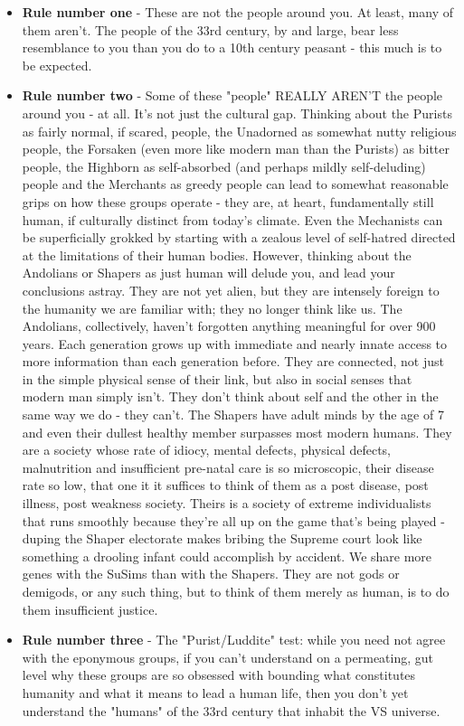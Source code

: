\begin{itemize}
\item {\bf Rule number one} - These are not the people around you. At least, many
of them aren't. The people of the 33rd century, by and large, bear
less resemblance to you than you do to a 10th century peasant - this
much is to be expected.

\item {\bf Rule number two} - Some of these "people" REALLY AREN'T the
people around you - at all. It's not just the cultural gap. Thinking
about the Purists as fairly normal, if scared, people, the Unadorned
as somewhat nutty religious people, the Forsaken (even more like
modern man than the Purists) as bitter people, the Highborn as
self-absorbed (and perhaps mildly self-deluding) people and the
Merchants as greedy people can lead to somewhat reasonable grips on
how these groups operate - they are, at heart, fundamentally still
human, if culturally distinct from today's climate. Even the
Mechanists can be superficially grokked by starting with a zealous
level of self-hatred directed at the limitations of their human
bodies. However, thinking about the Andolians or Shapers as just human
will delude you, and lead your conclusions astray. They are not yet
alien, but they are intensely foreign to the humanity we are familiar
with; they no longer think like us. The Andolians, collectively,
haven't forgotten anything meaningful for over 900 years. Each
generation grows up with immediate and nearly innate access to more
information than each generation before. They are connected, not just
in the simple physical sense of their link, but also in social senses
that modern man simply isn't. They don't think about self and the
other in the same way we do - they can't. The Shapers have adult minds
by the age of 7 and even their dullest healthy member surpasses most
modern humans. They are a society whose rate of idiocy, mental
defects, physical defects, malnutrition and insufficient pre-natal care
is so microscopic, their disease rate so low, that one it it suffices
to think of them as a post disease, post illness, post weakness
society. Theirs is a society of extreme individualists that runs
smoothly because they're all up on the game that's being played -
duping the Shaper electorate makes bribing the Supreme court look like
something a drooling infant could accomplish by accident. We share
more genes with the SuSims than with the Shapers. They are not gods or
demigods, or any such thing, but to think of them merely as human, is
to do them insufficient justice.

\item {\bf Rule number three} - The "Purist/Luddite" test: while you need
not agree with the eponymous groups, if you can't understand on a
permeating, gut level why these groups are so obsessed with bounding
what constitutes humanity and what it means to lead a human life, then
you don't yet understand the "humans" of the 33rd century that inhabit
the VS universe.
\end{itemize}
